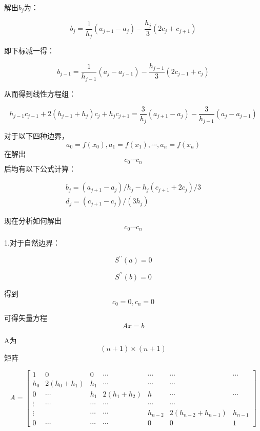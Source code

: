 \documentclass[UTF8]{ctexart}
\begin{document}
解出$b_j$为：

\begin{equation}
b_{j}=\frac{1}{h_{j}}\left(a_{j+1}-a_{j}\right)-\frac{h_{j}}{3}\left(2 c_{j}+c_{j+1}\right)
\end{equation}

即下标减一得：

\begin{equation}
b_{j-1}=\frac{1}{h_{j-1}}\left(a_{j}-a_{j-1}\right)-\frac{h_{j-1}}{3}\left(2 c_{j-1}+c_{j}\right)
\end{equation}


从而得到线性方程组：

\begin{equation}
h_{j-1} c_{j-1}+2\left(h_{j-1}+h_{j}\right) c_{j}+h_{j} c_{j+1}=\frac{3}{h_{j}}\left(a_{j+1}-a_{j}\right)-\frac{3}{h_{j-1}}\left(a_{j}-a_{j-1}\right)
\end{equation}


对于以下四种边界，$$
a_{0}=f\left(x_{0}\right), a_{1}=f\left(x_{1}\right), \cdots, a_{n}=f\left(x_{n}\right)
$$
在解出$$ c_0 \cdots c_n$$后均有以下公式计算：


$$
\begin{array}{l}{b_{j}=\left(a_{j+1}-a_{j}\right) / h_{j}-h_{j}\left(c_{j+1}+2 c_{j}\right) / 3} \\ {d_{j}=\left(c_{j+1}-c_{j}\right) /\left(3 h_{j}\right)}\end{array}
$$


现在分析如何解出$$ c_0 \cdots c_n$$

1.对于自然边界：

$$S^{\prime\prime}(a)=0 $$ 

$$S^{\prime\prime}(b)=0 $$

得到$$ c_0=0,c_n=0$$

可得矢量方程$$ Ax=b$$


A为$$ (n+1)\times (n+1)$$矩阵


$$
A=\left[\begin{array}{lllllll}
{1} & {0} & {0} & {\cdots} & {\cdots} & {\cdots} & {\cdots} \\ 
{h_{0}} & {2\left(h_{0}+h_{1}\right)} & {h_{1}} & {\cdots} & {\cdots} & {\cdots} \\ 
{0} & {\cdots} & {h_{1} } & {2\left(h_{1}+h_{2}\right)} & {h} & {\cdots} & {\cdots} \\ 
{\vdots} & {\cdots} & {\cdots} & {\cdots} & {\cdots} & {\cdots} \\ 
{\vdots} & {} & {\cdots} & {\cdots} & {h_{n-2}} & { 2(h_{n-2}+h_{n-1})} & {h_{n-1}} \\ 
{0} & {\cdots} & {\cdots} & {\cdots}  & {0} & {0} & {1}
\end{array}\right]
$$
\end{document}
